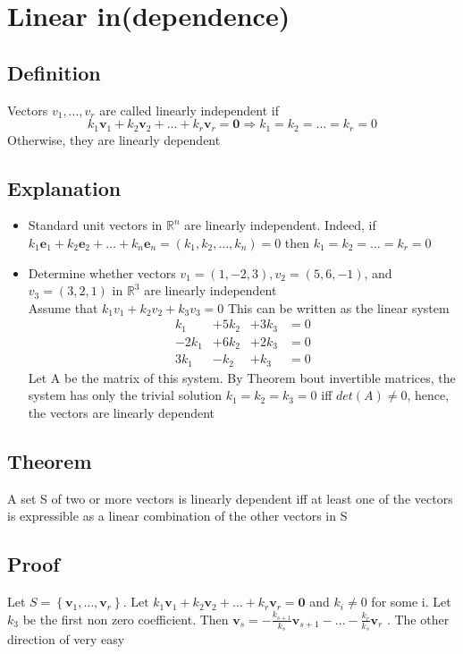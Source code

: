 \documentclass{article}[18pt]
\begin{document}
\section{Linear in(dependence)}
\subsection{Definition}
Vectors $v_1,...,v_r$ are called linearly independent if
$$k _ { 1 } \mathbf { v } _ { 1 } + k _ { 2 } \mathbf { v } _ { 2 } + \ldots + k _ { r } \mathbf { v } _ { r } = \mathbf { 0 } \Rightarrow k _ { 1 } = k _ { 2 } = \ldots = k _ { r } = 0$$
Otherwise, they are linearly dependent
\subsection{Explanation}
\begin{itemize}
	\item Standard unit vectors in $\mathbb{ R }^n$ are linearly independent. Indeed, if $k _ { 1 } \mathbf { e } _ { 1 } + k _ { 2 } \mathbf { e } _ { 2 } + \ldots + k _ { n } \mathbf { e } _ { n } = \left( k _ { 1 } , k _ { 2 } , \ldots , k _ { n } \right) = 0$ then $k _ { 1 } = k _ { 2 } = \ldots = k _ { r } = 0$
	\item Determine whether vectors $v_1=(1,-2,3), v_2=(5,6,-1)$, and $v_3=(3,2,1)$ in $\mathbb{ R }^3$ are linearly independent\\
	Assume that $k_1v_1+k_2v_2+k_3v_3=0$ This can be written as the linear system
	$$\begin{aligned} k _ { 1 } &+ 5 k _ { 2 } & + 3 k _ { 3 } & = 0 \\ - 2 k _ { 1 } &+ 6 k _ { 2 } & + 2 k _ { 3 } & = 0 \\ 3 k _ { 1 } & - k _ { 2 } & + k _ { 3 } & = 0 \end{aligned}$$
	Let A be the matrix of this system. By Theorem bout invertible matrices, the system has only the trivial solution $k_1=k_2=k_3=0$ iff $det(A)\neq0$, hence, the vectors are linearly dependent
\end{itemize}
\subsection{Theorem}
A set S of two or more vectors is linearly dependent iff at least one of the vectors is expressible as a linear combination of the other vectors in S
\subsection{Proof}
Let $S = \left\{ \mathbf { v } _ { 1 } , \ldots , \mathbf { v } _ { r } \right\} . \text { Let } k _ { 1 } \mathbf { v } _ { 1 } + k _ { 2 } \mathbf { v } _ { 2 } + \ldots + k _ { r } \mathbf { v } _ { r } = \mathbf { 0 }$ and $k_i\neq 0$ for some i. Let $k_3$ be the first non zero coefficient. Then $\mathbf { v } _ { s } = - \frac { k _ { s + 1 } } { k _ { s } } \mathbf { v } _ { s + 1 } - \ldots - \frac { k _ { r } } { k _ { s } } \mathbf { v } _ { r }$ . The other direction of very easy
\end{document}
